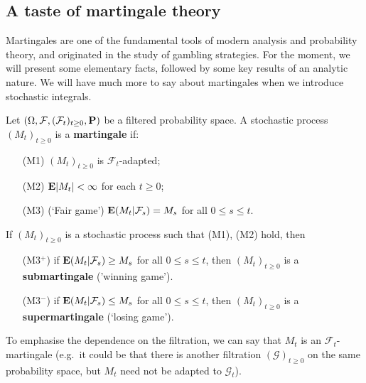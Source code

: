 
\subsection{A taste of martingale theory}
Martingales are one of the fundamental tools of modern analysis and probability theory, and originated in the study of gambling strategies. For the moment, we will present some elementary facts, followed by some key results of an analytic nature. We will have much more to say about martingales when we introduce stochastic integrals.

\begin{definition}
Let $(\Omega,\mathcal{F},(\mathcal{F}_t)_{t\ge 0},\mathbf{P})$ be a filtered probability space. A stochastic process $(M_t)_{t\ge 0}$ is a \textbf{martingale} if:
\begin{itemize}
    \item[(M1)] $(M_t)_{t\ge 0}$ is $\mathcal{F}_t$-adapted;
    \item[(M2)] $\mathbf{E}|M_t| <\infty$ for each $t\ge 0$;
    \item[(M3)] (`Fair game') $\mathbf{E}(M_t|\mathcal{F}_s) = M_s$ for all $0\le s\le t$.
\end{itemize}
If $(M_t)_{t \ge 0}$ is a stochastic process such that (M1), (M2) hold, then
\begin{itemize}
    \setlength\itemindent{10pt}\item[(M3$^+$)] if $\mathbf{E}(M_t|\mathcal{F}_s) \ge M_s$ for all $0\le s\le t$, then $(M_t)_{t\ge 0}$ is a \textbf{submartingale} ('winning game').

    \setlength\itemindent{10pt}\item[(M3$^-$)] if $\mathbf{E}(M_t|\mathcal{F}_s) \le M_s$ for all $0\le s\le t$, then $(M_t)_{t\ge 0}$ is a \textbf{supermartingale} (`losing game').
\end{itemize}
\end{definition}
To emphasise the dependence on the filtration, we can say that $M_t$ is an $\mathcal{F}_t$-martingale (e.g.\ it could be that there is another filtration $(\mathcal{G})_{t\ge 0}$ on the same probability space, but $M_t$ need not be adapted to $\mathcal{G}_t$).

